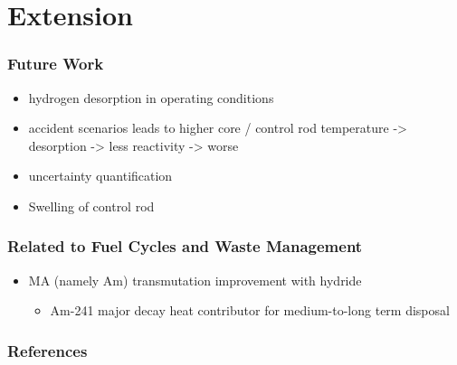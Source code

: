 \documentclass[9pt]{beamer}
\begin{document}
\section{Extension}


\begin{frame}
\frametitle{Future Work}
\begin{itemize}
  \item hydrogen desorption in operating conditions
  \item accident scenarios
    leads to higher core / control rod temperature -> desorption -> less reactivity -> worse
  \item uncertainty quantification
  \item Swelling of control rod
\end{itemize}

\end{frame}

\begin{frame}
\frametitle{Related to Fuel Cycles and Waste Management}
\begin{itemize}
    \item \gls{MA} (namely Am) transmutation improvement with hydride \cite{ikeda_feasibility_2017}
    \begin{itemize}
      \item Am-241 major decay heat contributor for medium-to-long term disposal
    \end{itemize}
\end{itemize}
\end{frame}

\begin{frame}[allowframebreaks]
  \frametitle{References}
  
  {\footnotesize  }
\end{frame}

\end{document}
